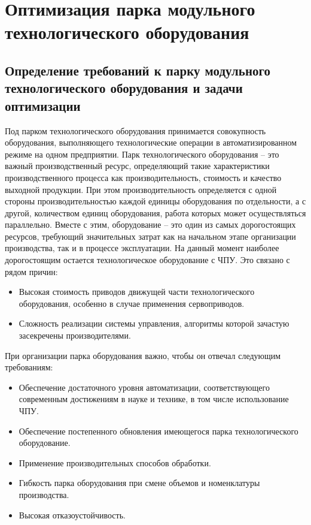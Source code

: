 \section{Оптимизация парка модульного технологического оборудования}
	 
\subsection{Определение требований к парку модульного технологического оборудования и задачи оптимизации}

Под парком технологического оборудования принимается совокупность оборудования, выполняющего технологические операции в автоматизированном режиме на одном предприятии. Парк технологического оборудования -- это важный производственный ресурс, определяющий такие характеристики производственного процесса как производительность, стоимость и качество выходной продукции. При этом производительность определяется с одной стороны производительностью каждой единицы оборудования по отдельности, а с другой, количеством единиц оборудования, работа которых может осуществляться параллельно.  Вместе с этим, оборудование -- это один из самых дорогостоящих ресурсов, требующий значительных затрат как на начальном этапе организации производства, так и в процессе эксплуатации. На данный момент наиболее дорогостоящим остается технологическое оборудование с ЧПУ. Это связано с рядом причин:

\begin{itemize}
	\item Высокая стоимость приводов движущей части технологического оборудования, особенно в случае применения сервоприводов.
	\item Сложность реализации системы управления, алгоритмы которой зачастую засекречены производителями.
\end{itemize}

При организации парка оборудования важно, чтобы он отвечал следующим требованиям:

\begin{itemize}
	\item Обеспечение достаточного уровня автоматизации, соответствующего современным достижениям в науке и технике, в том числе использование ЧПУ.
	\item Обеспечение постепенного обновления имеющегося парка технологического оборудование.
	\item Применение производительных способов обработки.
	\item Гибкость парка оборудования при смене объемов и номенклатуры производства.
	\item Высокая отказоустойчивость.
\end{itemize}

